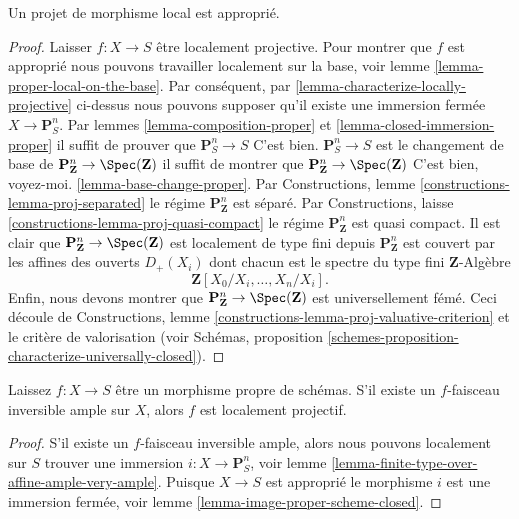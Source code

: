\begin{lemma}

\label{lemma-locally-projective-proper}
Un projet de morphisme local est approprié.
\end{lemma}

\begin{proof}

Laisser $f : X \to S$ être localement projective. Pour montrer que $f$ est approprié nous pouvons travailler localement sur la base, voir lemme \ref{lemma-proper-local-on-the-base}. Par conséquent, par \ref{lemma-characterize-locally-projective}
ci-dessus nous pouvons supposer qu'il existe une immersion fermée $X \to \mathbf{P}^n_S$. Par lemmes \ref{lemma-composition-proper}
et \ref{lemma-closed-immersion-proper} il suffit de prouver que
$\mathbf{P}^n_S \to S$ C'est bien.
$\mathbf{P}^n_S \to S$ est le changement de base de
$\mathbf{P}^n_{\mathbf{Z}} \to \Spec(\mathbf{Z})$ il suffit de montrer que $\mathbf{P}^n_{\mathbf{Z}} \to \Spec(\mathbf{Z})$
C'est bien, voyez-moi. \ref{lemma-base-change-proper}. Par Constructions, lemme \ref{constructions-lemma-proj-separated} le régime
$\mathbf{P}^n_{\mathbf{Z}}$ est séparé. Par Constructions, laisse \ref{constructions-lemma-proj-quasi-compact} le régime
$\mathbf{P}^n_{\mathbf{Z}}$ est quasi compact. Il est clair que $\mathbf{P}^n_{\mathbf{Z}} \to \Spec(\mathbf{Z})$
est localement de type fini depuis $\mathbf{P}^n_{\mathbf{Z}}$ est couvert par les affines des ouverts $D_{+}(X_i)$ dont chacun est le spectre du type fini $\mathbf{Z}$-Algèbre
$$
\mathbf{Z}[X_0/X_i, \ldots, X_n/X_i].
$$
Enfin, nous devons montrer que
$\mathbf{P}^n_{\mathbf{Z}} \to \Spec(\mathbf{Z})$
est universellement fémé. Ceci découle de Constructions, lemme \ref{constructions-lemma-proj-valuative-criterion}
et le critère de valorisation (voir Schémas, proposition \ref{schemes-proposition-characterize-universally-closed}).

\end{proof}

\begin{lemma}

\label{lemma-proper-ample-locally-projective}
Laissez $f : X \to S$ être un morphisme propre de schémas. S'il existe un $f$-faisceau inversible ample sur $X$, alors $f$ est localement projectif.
\end{lemma}

\begin{proof}
S'il existe un $f$-faisceau inversible ample, alors nous pouvons localement sur $S$ trouver une immersion $i : X \to \mathbf{P}^n_S$, voir lemme \ref{lemma-finite-type-over-affine-ample-very-ample}. Puisque $X \to S$ est approprié le morphisme $i$ est une immersion fermée, voir lemme \ref{lemma-image-proper-scheme-closed}.
\end{proof}

